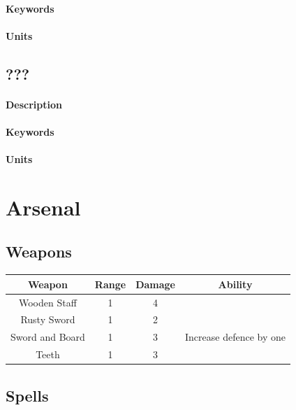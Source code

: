 \documentclass[a5paper,pagesize,10pt,bibtotoc,pointlessnumbers,
normalheadings,DIV=9,twoside=false]{scrbook}
\begin{document}
\subsubsection{Keywords}
\emph{}

\subsubsection{Units}

\newpage
\section{???}

\subsubsection{Description}

\subsubsection{Keywords}
\emph{}

\subsubsection{Units}

\chapter{Arsenal}

\section{Weapons}

 \begin{tabular}{||c c c c||} 
 \hline
 Weapon & Range & Damage & Ability \\
\hline \hline
Wooden Staff & 1 & 4 &  \\
\hline
Rusty Sword & 1 & 2 &  \\
\hline
Sword and Board & 1 & 3 & Increase defence by one \\
\hline
Teeth & 1 & 3 & \\
\hline
 
 \end{tabular}
\newpage
\section{Spells}
\end{document}
